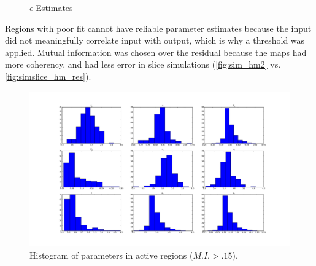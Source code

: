 \begin{figure}[H]
\centering
{}
\caption{$\epsilon$ Estimates}
\label{fig:pmap6}
\end{figure}

Regions with poor fit cannot have reliable parameter estimates because the input did not meaningfully
correlate input with output, which is why a threshold was applied.
Mutual information was chosen over the residual because the
maps had more coherency, and had less error in slice simulations (\autoref{fig:sim_hm2} vs.
\autoref{fig:simslice_hm_res}).

\begin{figure}
\centering
\includegraphics[clip=truew,trim=8cm 4cm 8cm 4cm,width=16cm]{images/realhist}
\caption{Histogram of parameters in active regions ($M.I. > .15$).}
\label{fig:realhist}
\end{figure}

